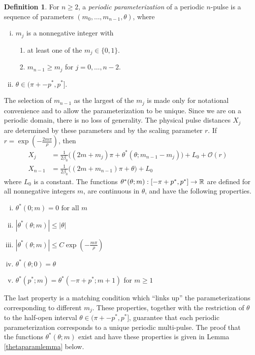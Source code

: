 \documentclass[11pt,reqno]{amsart}
\theoremstyle{plain}
\theoremstyle{definition}
\newtheorem{definition}[theorem]{Definition}
\theoremstyle{remark}
\begin{document}
\begin{definition}\label{def:perparam}
For $n \geq 2$, a \emph{periodic parameterization} of a periodic $n$-pulse is a sequence of parameters $(m_0, \dots, m_{n-1}, \theta)$, where
\begin{enumerate}[(i)]
\item $m_j$ is a nonnegative integer with
\begin{enumerate}
\item at least one of the $m_j \in \{0, 1\}$.
\item $m_{n-1} \geq m_j$ for $j = 0, \dots, n-2$.
\end{enumerate}
\item $\theta \in (\pi + -p^*, p^*]$.
\end{enumerate}
\end{definition}
The selection of $m_{n-1}$ as the largest of the $m_j$ is made only for notational convenience and to allow the parameterization to be unique. Since we are on a periodic domain, there is no loss of generality. The physical pulse distances $X_j$ are determined by these parameters and by the scaling parameter $r$. If $r = \exp\left(-\frac{2 m \pi}{\rho}\right)$, then
\begin{align*}
X_j &= \frac{1}{2 \beta_0}\big( (2 m + m_j)\pi + \theta^*(\theta; m_{n-1} - m_j)\big) + L_0 + \mathcal{O}(r) \\
X_{n-1} &= \frac{1}{2 \beta_0}\big( (2 m + m_{n-1})\pi + \theta \big) + L_0
\end{align*}
where $L_0$ is a constant. The functions $\theta^*(\theta; m): [-\pi + p^*, p^*] \rightarrow \mathbb{R}$ are defined for all nonnegative integers $m$, are continuous in $\theta$, and have the following properties.
\begin{enumerate}[(i)]
\item $\theta^*(0; m) = 0 \text{ for all } m$
\item $|\theta^*(\theta; m)| \leq |\theta|$
\item $|\theta^*(\theta; m)| \leq C \exp\left(-\frac{m \pi}{\rho} \right)$
\item $\theta^*(\theta; 0) = \theta $
\item $\theta^*(p^*; m) = \theta^*(-\pi+p^*; m+1)$ for $m \geq 1$
\end{enumerate}
The last property is a matching condition which ``links up'' the parameterizations corresponding to different $m_j$. These properties, together with the restriction of $\theta$ to the half-open interval $\theta \in (\pi + -p^*, p^*]$, guarantee that each periodic parameterization corresponds to a unique periodic multi-pulse. The proof that the functions $\theta^*(\theta; m)$ exist and have these properties is given in Lemma \ref{thetaparamlemma} below.
\end{document}
